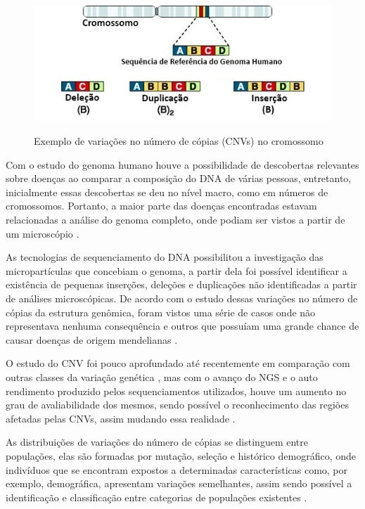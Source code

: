 \begin{figure}[!htb]
    \centering
    \caption{Exemplo de variações no número de cópias (CNVs) no cromossomo}
    \includegraphics[width=1\textwidth]{./dados/figuras/copy-number-variation}
    \label{fig:figura-copy-number-variation}
\end{figure}

Com o estudo do genoma humano \cite{Lander2001} houve a possibilidade de descobertas relevantes sobre doenças ao comparar a composição do DNA de várias pessoas, entretanto, inicialmente essas descobertas se deu no nível macro, como em números de cromossomos. Portanto, a maior parte das doenças encontradas estavam relacionadas a análise do genoma completo, onde podiam ser vistos a partir de um microscópio \cite{Feuk2006}.

As tecnologias de sequenciamento do DNA possibilitou a investigação das micropartículas que concebiam o genoma, a partir dela foi possível identificar a existência de pequenas inserções, deleções e duplicações não identificadas a partir de análises microscópicas. De acordo com o estudo dessas variações no número de cópias da estrutura genômica, foram vistos uma série de casos onde não representava nenhuma consequência e outros que possuíam uma grande chance de causar doenças de origem mendelianas \cite{Feuk2006,Xi2011}.

O estudo do CNV foi pouco aprofundado até recentemente em comparação com outras classes da variação genética \cite{Redon2006}, mas com o avanço do NGS e o auto rendimento produzido pelos sequenciamentos utilizados, houve um aumento no grau de avaliabilidade dos mesmos, sendo possível o reconhecimento das regiões afetadas pelas CNVs, assim mudando essa realidade \cite{Mills2011,Feuk2006}.

As distribuições de variações do número de cópias se distinguem entre populações, elas são formadas por mutação, seleção e histórico demográfico, onde indivíduos que se encontram expostos a determinadas características como, por exemplo, demográfica, apresentam variações semelhantes, assim sendo possível a identificação e classificação entre categorias de populações existentes \cite{Redon2006}.

